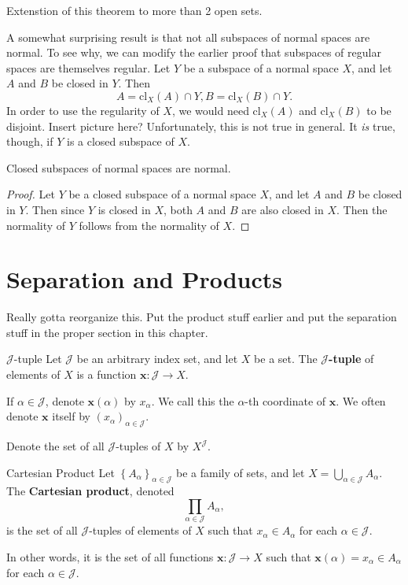 \documentclass[10pt]{report}
\begin{document}
{\color{red}Extenstion of this theorem to more than 2 open sets.}

A somewhat surprising result is that not all subspaces of normal spaces are normal. To see why, we can modify the earlier proof that subspaces of regular spaces are themselves regular. Let $Y$ be a subspace of a normal space $X$, and let $A$ and $B$ be closed in $Y$. Then
\[
	A= \text{cl}_X(A) \cap Y, B = \text{cl}_X(B) \cap Y.
\] In order to use the regularity of $X$, we would need $\text{cl}_X(A)$ and $\text{cl}_X(B)$ to be disjoint. {\color{red}Insert picture here?} Unfortunately, this is not true in general. It \textit{is} true, though, if $Y$ is a closed subspace of $X$.

\begin{prop}
Closed subspaces of normal spaces are normal.
\end{prop}
\begin{proof}
	Let $Y$ be a closed subspace of a normal space $X$, and let $A$ and $B$ be closed in $Y$. Then since $Y$ is closed in $X$, both $A$ and $B$ are also closed in $X$. Then the normality of $Y$ follows from the normality of $X$.
\end{proof}



\section{Separation and Products}

{\color{red}Really gotta reorganize this. Put the product stuff earlier and put the separation stuff in the proper section in this chapter.}

\begin{defn}{$\mathcal{J}$-tuple}{}
	Let $\mathcal{J}$ be an arbitrary index set, and let $X$ be a set. The \textbf{$\mathcal{J}$-tuple} of elements of $X$ is a function $\mathbf{x}:\mathcal{J}\to X$.

	If $\alpha\in\mathcal{J}$, denote $\mathbf{x}(\alpha)$ by $x_{\alpha}$. We call this the $\alpha$-th coordinate of $\mathbf{x}$. We often denote $\mathbf{x}$ itself by $(x_{\alpha})_{\alpha\in\mathcal{J}}$.

	Denote the set of all $\mathcal{J}$-tuples of $X$ by $X^{\mathcal{J}}$.
\end{defn}

\begin{defn}{Cartesian Product}{}
Let $\left\{ A_{\alpha} \right\}_{\alpha\in\mathcal{J}}$ be a family of sets, and let $X = \bigcup_{\alpha\in\mathcal{J}}A_{\alpha}$. The \textbf{Cartesian product}, denoted
\[
\prod_{\alpha\in\mathcal{J}}A_{\alpha},
\] is the set of all $\mathcal{J}$-tuples of elements of $X$ such that $x_\alpha \in A_{\alpha}$ for each $\alpha\in\mathcal{J}$.

In other words, it is the set of all functions $\mathbf{x}:\mathcal{J}\to X$ such that $\mathbf{x}(\alpha)=x_{\alpha}\in A_{\alpha}$ for each $\alpha\in\mathcal{J}$.
\end{defn}
\end{document}
